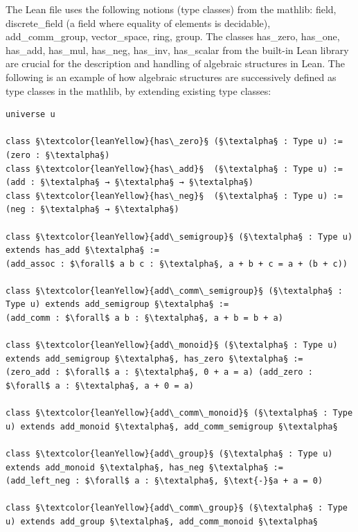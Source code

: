 \documentclass[11pt]{article}
\begin{document}
The Lean file uses the following notions (type classes) from the mathlib: {\lean field}, {\lean discrete\_field} (a field where equality of elements is decidable), {\lean add\_comm\_group}, {\lean vector\_space}, {\lean ring}, {\lean group}.
The classes {\lean has\_zero}, {\lean has\_one}, {\lean has\_add}, {\lean has\_mul}, {\lean has\_neg}, {\lean has\_inv}, {\lean has\_scalar} from the built-in Lean library are crucial for the description and handling of algebraic structures in Lean.
The following is an example of how algebraic structures are successively defined as type classes in the mathlib, by extending existing type classes:
\begin{lstlisting}
universe u

class §\textcolor{leanYellow}{has\_zero}§ (§\textalpha§ : Type u) := (zero : §\textalpha§)
class §\textcolor{leanYellow}{has\_add}§  (§\textalpha§ : Type u) := (add : §\textalpha§ → §\textalpha§ → §\textalpha§)
class §\textcolor{leanYellow}{has\_neg}§  (§\textalpha§ : Type u) := (neg : §\textalpha§ → §\textalpha§)

class §\textcolor{leanYellow}{add\_semigroup}§ (§\textalpha§ : Type u) extends has_add §\textalpha§ :=
(add_assoc : $\forall$ a b c : §\textalpha§, a + b + c = a + (b + c))

class §\textcolor{leanYellow}{add\_comm\_semigroup}§ (§\textalpha§ : Type u) extends add_semigroup §\textalpha§ :=
(add_comm : $\forall$ a b : §\textalpha§, a + b = b + a)

class §\textcolor{leanYellow}{add\_monoid}§ (§\textalpha§ : Type u) extends add_semigroup §\textalpha§, has_zero §\textalpha§ :=
(zero_add : $\forall$ a : §\textalpha§, 0 + a = a) (add_zero : $\forall$ a : §\textalpha§, a + 0 = a)

class §\textcolor{leanYellow}{add\_comm\_monoid}§ (§\textalpha§ : Type u) extends add_monoid §\textalpha§, add_comm_semigroup §\textalpha§

class §\textcolor{leanYellow}{add\_group}§ (§\textalpha§ : Type u) extends add_monoid §\textalpha§, has_neg §\textalpha§ :=
(add_left_neg : $\forall$ a : §\textalpha§, §\text{-}§a + a = 0)

class §\textcolor{leanYellow}{add\_comm\_group}§ (§\textalpha§ : Type u) extends add_group §\textalpha§, add_comm_monoid §\textalpha§
\end{lstlisting}
\end{document}
